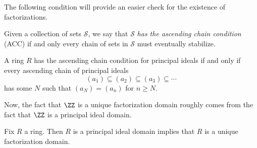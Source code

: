The following condition will provide an easier check for the existence of factorizations.
\begin{definition}
	Given a collection of sets $\mathcal S$, we say that $\mathcal S$ \textit{has the ascending chain condition} (ACC) if and only every chain of sets in $\mathcal S$ must eventually stabilize.
\end{definition}
\begin{defi}
	A ring $R$ has the ascending chain condition for principal ideals if and only if every ascending chain of principal ideals
	\[(a_1)\subseteq (a_2)\subseteq(a_3)\subseteq\cdots\]
	has some $N$ such that $(a_N)=(a_n)$ for $n\ge N$.
\end{defi}
Now, the fact that $\ZZ$ is a unique factorization domain roughly comes from the fact that $\ZZ$ is a principal ideal domain.
\begin{theorem}
	Fix $R$ a ring. Then $R$ is a principal ideal domain implies that $R$ is a unique factorization domain.
\end{theorem}
